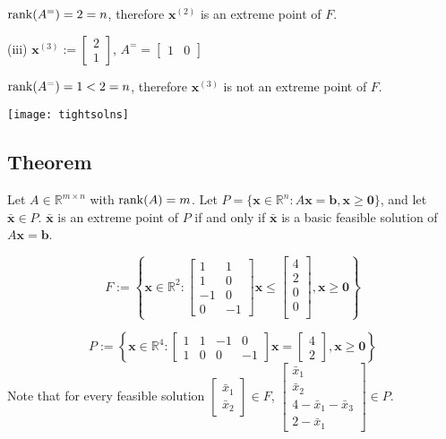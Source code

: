 $ \operatorname{rank}(A^=)=2=n $, therefore $\bm{x}^{(2)}$ is an extreme
point of $ F $.

(iii)
$\bm{x}^{(3)}:=\begin{bmatrix}2\\1\end{bmatrix}$,
$ A^= =
\begin{bmatrix}
    1 & 0
\end{bmatrix} $

$ \operatorname{rank}(A^=)=1<2=n $, therefore $\bm{x}^{(3)}$ is not an extreme
point of $ F $.

\begin{center}
    \texttt{[image: tightsolns]}
\end{center}

\begin{thmbox}
    \subsection{Theorem}
    Let $ A\in\mathbb{R}^{m\times n} $ with $ \operatorname{rank}(A)=m $. 
    Let $ P=\{\bm{x}\in\mathbb{R}^n: A \bm{x}=\bm{b},
    \bm{x}\ge \bm{0}\} $, and let $ \bm{\bar{x}}\in P $.
    $ \bm{\bar{x}} $ is an extreme point of $ P $ if and only if $ \bm{\bar{x}} $ is a basic feasible solution of $  A \bm{x}=\bm{b} $.
\end{thmbox}

\[ F:=\left\{ \bm{x}\in\mathbb{R}^2: \begin{bmatrix}
    1 & 1\\
    1 & 0\\
    -1 & 0\\
    0 & -1
\end{bmatrix}\bm{x}\le
\begin{bmatrix}
    4\\
    2\\
    0\\
    0\\
\end{bmatrix}, \bm{x}\ge \bm{0} \right\} \]

\[ P:=\left\{\bm{x}\in\mathbb{R}^4:
\begin{bmatrix}
    1&1&-1&0\\
    1&0&0&-1
\end{bmatrix}\bm{x}=
\begin{bmatrix}
    4\\
    2
\end{bmatrix}, \bm{x}\ge \bm{0}\right\} \]
Note that for every feasible solution
$ \begin{bmatrix}
    \bar{x}_1\\
    \bar{x}_2
\end{bmatrix}\in F $,
$ \begin{bmatrix}
    \bar{x}_1\\
    \bar{x}_2\\
    4-\bar{x}_1-\bar{x}_3\\
    2-\bar{x}_1
\end{bmatrix}\in P $.

